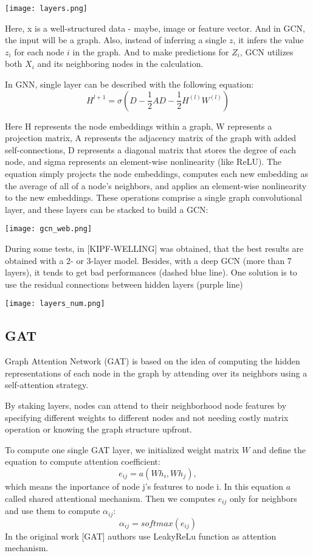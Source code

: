 \documentclass[a4paper,14pt]{article}
\begin{document}
\texttt{[image: layers.png]}

Here, x is a well-structured data - maybe, image or feature vector. And in GCN, the input will be a graph. Also, instead of inferring a single $z$, it infers the value $z_i$ for each node $i$ in the graph. And to make predictions for $Z_i$, GCN utilizes both $X_i$ and its neighboring nodes in the calculation.

In GNN, single layer can be described with the following equation:
\begin{equation}
H^{l+1} = \sigma(D - \frac{1}{2}AD - \frac{1}{2}H^{(l)}W^{(l)})
\end{equation}

Here H represents the node embeddings within a graph, W represents a projection matrix, A represents the adjacency matrix of the graph with added self-connections, D represents a diagonal matrix that stores the degree of each node, and sigma represents an element-wise nonlinearity (like ReLU). The equation simply projects the node embeddings, computes each new embedding as the average of all of a node’s neighbors, and applies an element-wise nonlinearity to the new embeddings. These operations comprise a single graph convolutional layer, and these layers can be stacked to build a GCN:

\texttt{[image: gcn\_web.png]}

During some tests, in [KIPF-WELLING] was obtained, that the best results are obtained with a 2- or 3-layer model. Besides, with a deep GCN (more than 7 layers), it tends to get bad performances (dashed blue line). One solution is to use the residual connections between hidden layers (purple line)

\texttt{[image: layers\_num.png]}

\subsection{GAT}
Graph Attention Network (GAT) \cite{GAT} is based on the idea of computing the hidden representations of each node in the graph by attending over its neighbors using a self-attention strategy.

By staking layers, nodes can attend to their neighborhood node features by specifying different weights to different nodes and not needing costly matrix operation or knowing the graph structure upfront.

To compute one single GAT layer, we initialized weight matrix $W$ and define the equation to compute attention coefficient:
\begin{equation}
    e_{ij} = a(Wh_i,Wh_j), 
\end{equation}
which means the inportance of node j's features to node i. In this equation $a$ called shared attentional mechanism. Then we computes $e_{ij}$ only for neighbors and use them to compute $\alpha_{ij}$:
\begin{equation}
    \alpha_{ij} = softmax(e_{ij})
\end{equation}
In the original work [GAT] authors use LeakyReLu function as attention mechanism.
\end{document}
